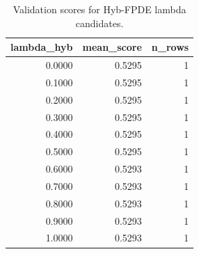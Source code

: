 \begin{table}[t]
\caption{Validation scores for Hyb-FPDE lambda candidates.}
\label{tab:lambda_distribution_computed}
\centering
\begin{tabular}{rrr}
\toprule
lambda\_hyb & mean\_score & n\_rows \\
\midrule
0.0000 & 0.5295 & 1 \\
0.1000 & 0.5295 & 1 \\
0.2000 & 0.5295 & 1 \\
0.3000 & 0.5295 & 1 \\
0.4000 & 0.5295 & 1 \\
0.5000 & 0.5295 & 1 \\
0.6000 & 0.5293 & 1 \\
0.7000 & 0.5293 & 1 \\
0.8000 & 0.5293 & 1 \\
0.9000 & 0.5293 & 1 \\
1.0000 & 0.5293 & 1 \\
\bottomrule
\end{tabular}

\end{table}
